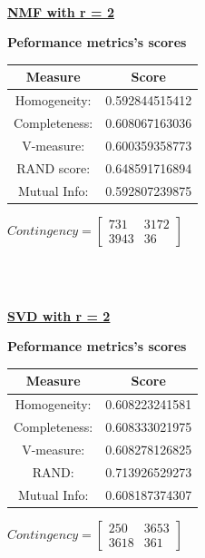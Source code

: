 \documentclass{article}
\begin{document}
\newpage


\\
\underline{\textbf{NMF with r = 2}} 
\begin{center}
	\textbf{Peformance metrics's scores} \\  \vspace{10pt}
	\begin{tabular}{*{2}{c}}
		\toprule
		\textbf{Measure} & \textbf{Score} \\
		\midrule
		Homogeneity: & 0.592844515412 \\
		\midrule
		Completeness: & 0.608067163036 \\
		\midrule
		V-measure: 	& 0.600359358773 \\
		\midrule
		RAND score: & 0.648591716894 \\
		\midrule
		Mutual Info:	& 0.592807239875 \\
		\bottomrule
	\end{tabular}
	\qquad	
	$Contingency = \left[\begin{array}{*{2}{c}}
 		731	& 3172 \\
 		3943 & 36 
				\end{array}\right]
	$
\end{center}
\\  \\ \vspace{20pt}



\underline{\textbf{SVD with r = 2}} 

\begin{center}
	\textbf{Peformance metrics's scores} \\  \vspace{10pt}
	\begin{tabular}{*{2}{c}}
		\toprule
		\textbf{Measure} & \textbf{Score} \\
		\midrule
		Homogeneity: & 0.608223241581 \\
		\midrule
		Completeness: & 0.608333021975 \\
		\midrule
		V-measure: & 0.608278126825 \\
		\midrule
		RAND: & 0.713926529273 \\
		\midrule
		Mutual Info: & 0.608187374307 \\
		\bottomrule
	\end{tabular}
	\qquad
	$Contingency = \left[\begin{array}{*{2}{c}}
		250 & 3653 \\
		3618 & 361 
			\end{array}\right]
		$
\end{center}
\newpage
\end{document}
